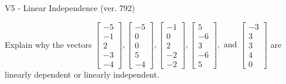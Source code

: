 \begin{exercise}
  \begin{exerciseTitle}V5 - Linear Independence (ver. 792)\end{exerciseTitle}
  \begin{exerciseStatement}
    Explain why the vectors \(\left[\begin{array}{r}
-5 \\
-1 \\
2 \\
-3 \\
-4
\end{array}\right] , \left[\begin{array}{r}
-5 \\
0 \\
0 \\
5 \\
-4
\end{array}\right] , \left[\begin{array}{r}
-1 \\
0 \\
2 \\
-2 \\
-2
\end{array}\right] , \left[\begin{array}{r}
5 \\
-6 \\
3 \\
-6 \\
5
\end{array}\right] , \text{ and } \left[\begin{array}{r}
-3 \\
3 \\
3 \\
4 \\
0
\end{array}\right]\) are linearly dependent or linearly independent.	



\end{exerciseStatement}
\end{exercise}
